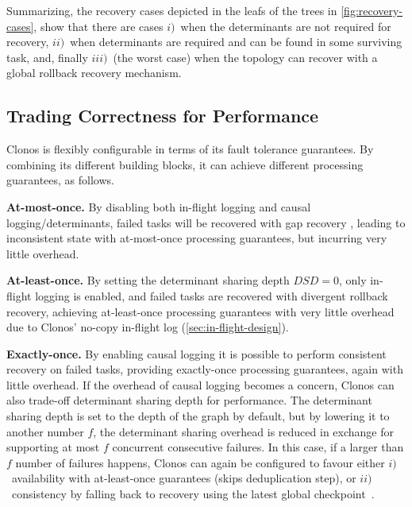 \documentclass[sigconf]{acmart}
\newcommand{\para}[1]{\vspace{1mm}\noindent\textbf{#1.}}
\begin{document}
Summarizing, the recovery cases depicted in the leafs of the trees in \autoref{fig:recovery-cases}, show that there are cases $i)$~when the determinants are not required for recovery, $ii)$~when determinants are required and can be found in some surviving task, and, finally $iii)$~(the worst case) when the topology can recover with a global rollback recovery mechanism.


\subsection{Trading Correctness for Performance}
Clonos is flexibly configurable in terms of its fault tolerance guarantees. By combining its different building blocks, it can achieve different processing guarantees, as follows.


\para{At-most-once} By disabling both in-flight logging and causal logging/determinants, failed tasks will be recovered with gap recovery \cite{Hwang2005HAA}, leading to inconsistent state with at-most-once processing guarantees, but incurring very little overhead.

\para{At-least-once} By setting the determinant sharing depth $DSD = 0$, only in-flight logging is enabled, and failed tasks are recovered with divergent rollback recovery, achieving at-least-once processing guarantees with very little overhead due to Clonos' no-copy in-flight log (\autoref{sec:in-flight-design}). 


\para{Exactly-once} By enabling causal logging it is possible to perform consistent recovery on failed tasks, providing exactly-once processing guarantees, again with little overhead. If the overhead of causal logging becomes a concern, Clonos can also trade-off determinant sharing depth for performance. The determinant sharing depth is set to the depth of the graph by default, but by lowering it to another number $f$, the determinant sharing overhead is reduced in exchange for supporting at most $f$ concurrent consecutive failures. In this case, if a larger than $f$ number of failures happens, Clonos can again be configured to favour either $i)$~availability with at-least-once guarantees (skips deduplication step), or $ii)$~consistency by falling back to recovery using the latest global checkpoint~\cite{Carbone2020beyond}.
\end{document}
